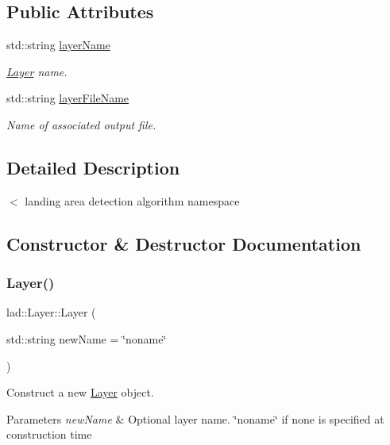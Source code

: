 \subsection*{Public Attributes}
\begin{DoxyCompactItemize}
\item 
std\+::string \hyperlink{classlad_1_1_layer_aadee8f64504428828f92591090f4f27d}{layer\+Name}
\begin{DoxyCompactList}\small\item\em \hyperlink{classlad_1_1_layer}{Layer} name. \end{DoxyCompactList}\item 
std\+::string \hyperlink{classlad_1_1_layer_a45420738ed98b38b86b863d1330c54f3}{layer\+File\+Name}
\begin{DoxyCompactList}\small\item\em Name of associated output file. \end{DoxyCompactList}\end{DoxyCompactItemize}


\subsection{Detailed Description}
$<$ landing area detection algorithm namespace 

\subsection{Constructor \& Destructor Documentation}
\mbox{\label{classlad_1_1_layer_a1a7d572812da1f17c292a0cfb977d4fe}} 
\subsubsection{\texorpdfstring{Layer()}{Layer()}}
{\footnotesize\ttfamily lad\+::\+Layer\+::\+Layer (\begin{DoxyParamCaption}\item[{std\+::string}]{new\+Name = {\ttfamily \char`\"{}noname\char`\"{}} }\end{DoxyParamCaption})\hspace{0.3cm}{\ttfamily [inline]}}



Construct a new \hyperlink{classlad_1_1_layer}{Layer} object. 


\begin{DoxyParams}{Parameters}
{\em new\+Name} & Optional layer name. \char`\"{}noname\char`\"{} if none is specified at construction time \\
\hline
\end{DoxyParams}
\mbox{\label{classlad_1_1_layer_abb04ca2570deb63ee685c3e8f74d872e}} 
